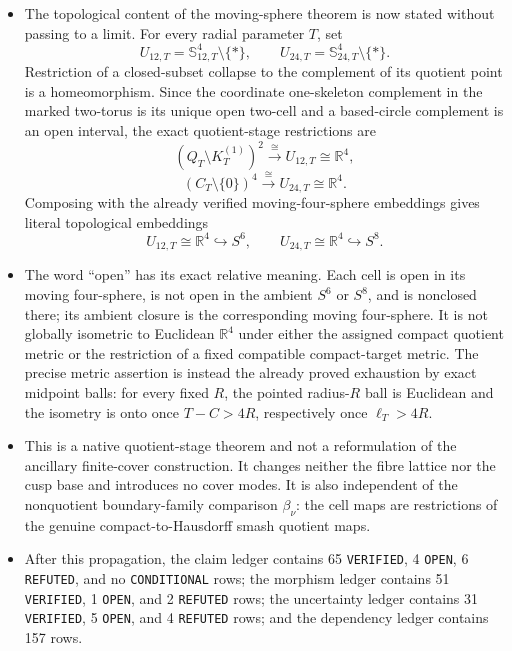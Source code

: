 \begin{itemize}[leftmargin=1.8em]
\item The topological content of the moving-sphere theorem is now stated
without passing to a limit.  For every radial parameter \(T\), set
\[
 U_{12,T}=\mathbb S_{12,T}^4\setminus\{*\},
 \qquad
 U_{24,T}=\mathbb S_{24,T}^4\setminus\{*\}.
\]
Restriction of a closed-subset collapse to the complement of its quotient
point is a homeomorphism.  Since the coordinate one-skeleton complement in
the marked two-torus is its unique open two-cell and a based-circle
complement is an open interval, the exact quotient-stage restrictions are
\[
 (Q_T\setminus K_T^{(1)})^2
 \xrightarrow{\ \cong\ }U_{12,T}\cong\mathbb R^4,
\]
\[
 (C_T\setminus\{0\})^4
 \xrightarrow{\ \cong\ }U_{24,T}\cong\mathbb R^4.
\]
Composing with the already verified moving-four-sphere embeddings gives
literal topological embeddings
\[
 U_{12,T}\cong\mathbb R^4\hookrightarrow S^6,
 \qquad
 U_{24,T}\cong\mathbb R^4\hookrightarrow S^8.
\]

\item The word ``open'' has its exact relative meaning.  Each cell is open
in its moving four-sphere, is not open in the ambient \(S^6\) or \(S^8\),
and is nonclosed there; its ambient closure is the corresponding moving
four-sphere.  It is not globally isometric to Euclidean \(\mathbb R^4\)
under either the assigned compact quotient metric or the restriction of a
fixed compatible compact-target metric.  The precise metric assertion is
instead the already proved exhaustion by exact midpoint balls: for every
fixed \(R\), the pointed radius-\(R\) ball is Euclidean and the isometry is
onto once \(T-C>4R\), respectively once \(\ell_T>4R\).

\item This is a native quotient-stage theorem and not a reformulation of the
ancillary finite-cover construction.  It changes neither the fibre lattice
nor the cusp base and introduces no cover modes.  It is also independent of
the nonquotient boundary-family comparison \(\beta_\nu\): the cell maps are
restrictions of the genuine compact-to-Hausdorff smash quotient maps.

\item After this propagation, the claim ledger contains 65
\texttt{VERIFIED}, 4 \texttt{OPEN}, 6 \texttt{REFUTED}, and no
\texttt{CONDITIONAL} rows; the morphism ledger contains 51
\texttt{VERIFIED}, 1 \texttt{OPEN}, and 2 \texttt{REFUTED} rows; the
uncertainty ledger contains 31 \texttt{VERIFIED}, 5 \texttt{OPEN}, and 4
\texttt{REFUTED} rows; and the dependency ledger contains 157 rows.
\end{itemize}

